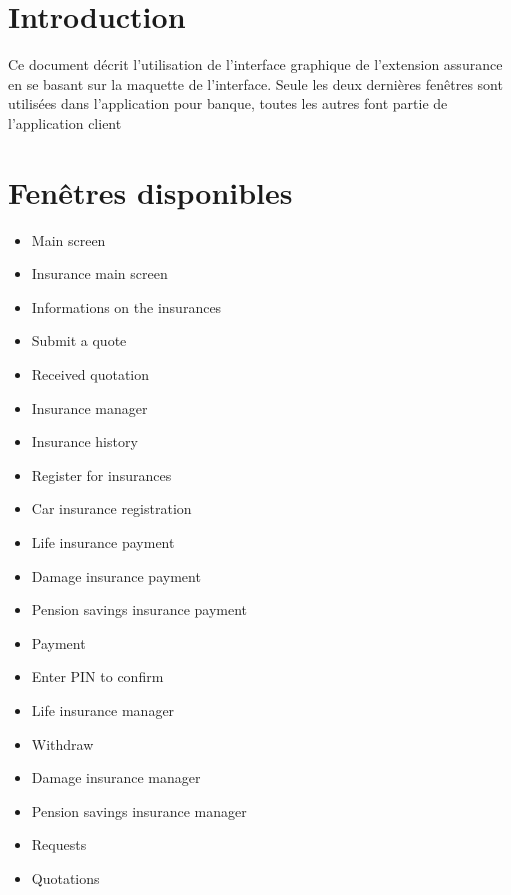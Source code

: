 \documentclass{article}
\begin{document}
\section{Introduction}
\noindent
Ce document décrit l'utilisation de l'interface graphique de l'extension assurance en se basant sur la maquette de l'interface. Seule les deux dernières fenêtres sont utilisées dans l'application pour banque, toutes les autres font partie de l'application client \\

\section{Fenêtres disponibles}
\begin{itemize}
\item Main screen
\item Insurance main screen
\item Informations on the insurances
\item Submit a quote
\item Received quotation
\item Insurance manager
\item Insurance history
\item Register for insurances
\item Car insurance registration
\item Life insurance payment
\item Damage insurance payment
\item Pension savings insurance payment
\item Payment
\item Enter PIN to confirm
\item Life insurance manager
\item Withdraw
\item Damage insurance manager
\item Pension savings insurance manager
\item Requests
\item Quotations
\end{itemize}
\end{document}
